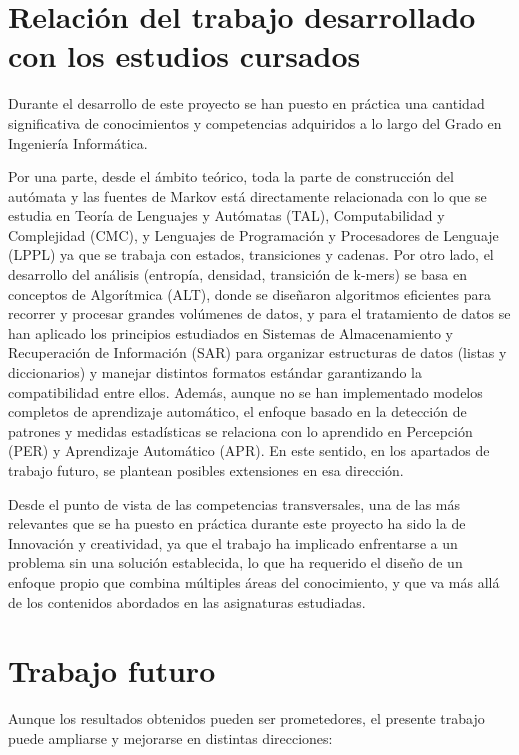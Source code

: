 \documentclass[11pt,spanish,listoffigures,listoftables]{tfgetsinf}
\begin{document}
\section{Relación del trabajo desarrollado con los estudios cursados}

Durante el desarrollo de este proyecto se han puesto en práctica una cantidad significativa de conocimientos y competencias adquiridos a lo largo del Grado en Ingeniería Informática. 

Por una parte, desde el ámbito teórico, toda la parte de construcción del autómata y las fuentes de Markov está directamente relacionada con lo que se estudia en Teoría de Lenguajes y Autómatas (TAL), Computabilidad y Complejidad (CMC), y Lenguajes de Programación y Procesadores de Lenguaje (LPPL) ya que se trabaja con estados, transiciones y cadenas. Por otro lado, el desarrollo del análisis (entropía, densidad, transición de k-mers) se basa en conceptos de Algorítmica (ALT), donde se diseñaron algoritmos eficientes para recorrer y procesar grandes volúmenes de datos, y para el tratamiento de datos se han aplicado los principios estudiados en Sistemas de Almacenamiento y Recuperación de Información (SAR) para organizar estructuras de datos (listas y diccionarios) y manejar distintos formatos estándar garantizando la compatibilidad entre ellos. Además, aunque no se han implementado modelos completos de aprendizaje automático, el enfoque basado en la detección de patrones y medidas estadísticas se relaciona con lo aprendido en Percepción (PER) y Aprendizaje Automático (APR). En este sentido, en los apartados de trabajo futuro, se plantean posibles extensiones en esa dirección.

Desde el punto de vista de las competencias transversales, una de las más relevantes que se ha puesto en práctica durante este proyecto ha sido la de Innovación y creatividad, ya que el trabajo ha implicado enfrentarse a un problema sin una solución establecida, lo que ha requerido el diseño de un enfoque propio que combina múltiples áreas del conocimiento, y que va más allá de los contenidos abordados en las asignaturas estudiadas.


\section{Trabajo futuro}

Aunque los resultados obtenidos pueden ser prometedores, el presente trabajo puede ampliarse y mejorarse en distintas direcciones:
\end{document}
